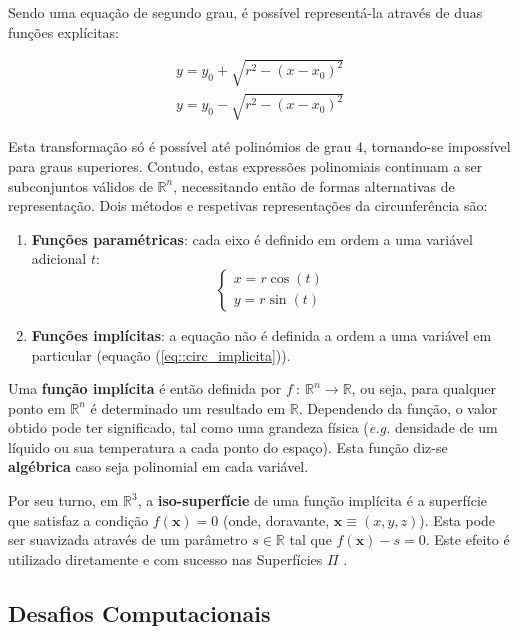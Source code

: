 Sendo uma equação de segundo grau, é possível representá-la através de duas funções explícitas:

\begin{eqnarray}
		y = y_0 + \sqrt{r^2 - (x - x_0)^2} \\
		y = y_0 - \sqrt{r^2 - (x - x_0)^2}
\end{eqnarray}

Esta transformação só é possível até polinómios de grau 4, tornando-se impossível para graus superiores. Contudo, estas expressões polinomiais continuam a ser subconjuntos válidos de $\mathbb{R}^n$, necessitando então de formas alternativas de representação. Dois métodos e respetivas representações da circunferência são:

\begin{enumerate}
	\item \textbf{Funções paramétricas}: cada eixo é definido em ordem a uma variável adicional $t$:
	\begin{equation}
		\left\{\begin{array}{l}
			x = r\cos(t) \\
			y = r\sin(t)
		\end{array}\right.
	\label{eq::circ_parametrica}
	\end{equation}
	
	\item \textbf{Funções implícitas}: a equação não é definida a ordem a uma variável em particular (equação (\ref{eq::circ_implicita})).
\end{enumerate}

Uma \textbf{função implícita} é então definida por $f~:~\mathbb{R}^n \longrightarrow \mathbb{R}$, ou seja, para qualquer ponto em $\mathbb{R}^n$ é determinado um resultado em $\mathbb{R}$. Dependendo da função, o valor obtido pode ter significado, tal como uma grandeza física (\textit{e.g.} densidade de um líquido ou sua temperatura a cada ponto do espaço). Esta função diz-se \textbf{algébrica} caso seja polinomial em cada variável.

Por seu turno, em $\mathbb{R}^3$, a \textbf{iso-superfície} de uma função implícita é a superfície que satisfaz a condição $f(\mathbf{x}) = 0$ (onde, doravante, $\mathbf{x} \equiv (x,y,z)$). Esta pode ser suavizada através de um parâmetro $s \in \mathbb{R}$ tal que $f(\mathbf{x}) - s = 0$. Este efeito é utilizado diretamente e com sucesso nas Superfícies $\Pi$ \cite{Raposo2019}.




\subsection{Desafios Computacionais}
\label{ssec::arte:implicitas:desafios}

